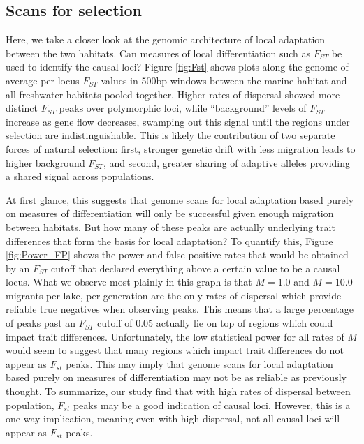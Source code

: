 \documentclass{article}
\newcommand{\plr}[1]{\todo[linecolor=blue,backgroundcolor=blue!25,bordercolor=blue]{#1}}
\begin{document}
\subsection*{Scans for selection}

Here, we take a closer look at the genomic architecture of local adaptation between the two habitats. 
Can measures of local differentiation such as $F_{ST}$ be used to identify the causal loci? 
Figure \ref{fig:Fst} shows plots along the genome of average per-locus $F_{ST}$ values 
in 500bp windows between the marine habitat and all freshwater habitats pooled together.
Higher rates of dispersal showed more distinct $F_{ST}$ peaks over polymorphic loci,
while ``background'' levels of $F_{ST}$ increase as gene flow decreases,
swamping out this signal until the regions under selection are indistinguishable. 
This is likely the contribution of two separate forces of natural selection: 
first, stronger genetic drift with less migration leads to higher background $F_{ST}$, and 
second, greater sharing of adaptive alleles providing a shared signal across populations.

At first glance, this suggests that genome scans for local adaptation based purely on measures of differentiation 
will only be successful given enough migration between habitats. 
But how many of these peaks are actually underlying trait differences that form the basis for local adaptation?
To quantify this, Figure \ref{fig:Power_FP} shows the power and false positive rates 
that would be obtained by an $F_{ST}$ cutoff 
that declared everything above a certain value to be a causal locus.
\plr{need to say what true and false positive windows are}
What we observe most plainly in this graph is that $M = 1.0$ and $M = 10.0$ migrants per lake, per generation
are the only rates of dispersal which provide reliable true negatives when observing peaks.
This means that a large percentage of peaks past an $F_{ST}$ cutoff of $0.05$ 
actually lie on top of regions which could impact trait differences. 
Unfortunately, the low statistical power for all rates of $M$ would seem to suggest
that many regions which impact trait differences do not appear as $F_{st}$ peaks. 
This may imply that genome scans for local adaptation based purely on measures of differentiation may not be as reliable as previously thought.
To summarize, our study find that with high rates of dispersal between population, $F_{st}$ peaks may be a good indication of causal loci.
However, this is a one way implication, meaning even with high dispersal, not all causal loci will appear as $F_{st}$ peaks.
\end{document}
